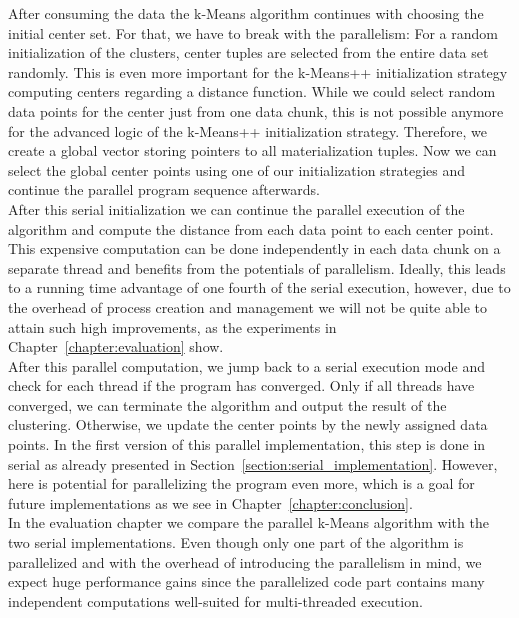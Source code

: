 After consuming the data the k-Means algorithm continues with choosing the initial center set. For that, we have to break with the parallelism: For a random initialization of the clusters, center tuples are selected from the entire data set randomly. This is even more important for the k-Means++ initialization strategy computing centers regarding a distance function. While we could select random data points for the center just from one data chunk, this is not possible anymore for the advanced logic of the k-Means++ initialization strategy. Therefore, we create a global vector storing pointers to all materialization tuples. Now we can select the global center points using one of our initialization strategies and continue the parallel program sequence afterwards.
\\
After this serial initialization we can continue the parallel execution of the algorithm and compute the distance from each data point to each center point. This expensive computation can be done independently in each data chunk on a separate thread and benefits from the potentials of parallelism. Ideally, this leads to a running time advantage of one fourth of the serial execution, however, due to the overhead of process creation and management we will not be quite able to attain such high improvements, as the experiments in Chapter~\ref{chapter:evaluation} show.
\\
After this parallel computation, we jump back to a serial execution mode and check for each thread if the program has converged. Only if all threads have converged, we can terminate the algorithm and output the result of the clustering. Otherwise, we update the center points by the newly assigned data points. In the first version of this parallel implementation, this step is done in serial as already presented in Section~\ref{section:serial_implementation}. However, here is potential for parallelizing the program even more, which is a goal for future implementations as we see in Chapter~\ref{chapter:conclusion}.
\\
In the evaluation chapter we compare the parallel k-Means algorithm with the two serial implementations. Even though only one part of the algorithm is parallelized and with the overhead of introducing the parallelism in mind, we expect huge performance gains since the parallelized code part contains many independent computations well-suited for multi-threaded execution.





